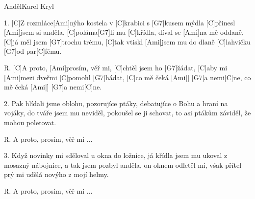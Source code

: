 \setcounter{page}{1}

\begin{song}{Anděl}{Karel Kryl}

\begin{xverse}{1. }
[C]Z rozmláce[Ami]nýho kostela v [C]krabici s [G7]kusem mýdla
[C]přinesl [Ami]jsem si anděla, [C]poláma[G7]li mu [C]křídla,
díval se [Ami]na mě oddaně, [C]já měl jsem [G7]trochu trému,
[C]tak vtiskl [Ami]jsem mu do dlaně [C]lahvičku [G7]od par[C]fému.
\end{xverse}

\begin{xverse}{R. }
[C]A proto, [Ami]prosím, věř mi, [C]chtěl jsem ho [G7]{žá}dat,
[C]aby mi [Ami]mezi dveřmi [C]pomohl [G7]hádat,
[C]co mě čeká [Ami|]{}   [G7]a nemi[C]ne, co mě čeká [Ami|]{}   [G7]a    nemi[C]ne.
\end{xverse}

\begin{xverse}{2. }
Pak hlídali jsme oblohu, pozorujíce ptáky,
debatujíce o Bohu a hraní na vojáky,
do tváře jsem mu neviděl, pokoušel se ji schovat,
to asi ptákům záviděl, že mohou poletovat.
\end{xverse}

\begin{xverse}{R. }
A proto, prosím, věř mi ...
\end{xverse}

\begin{xverse}{3. }
Když novinky mi sděloval u okna do ložnice,
já křídla jsem mu ukoval z mosazný nábojnice,
a tak jsem pozbyl anděla, on oknem odletěl mi,
však přítel prý mi udělá novýho z mojí helmy.
\end{xverse}

\begin{xverse}{R. }
A proto, prosím, věř mi ...
\end{xverse}

\end{song}

